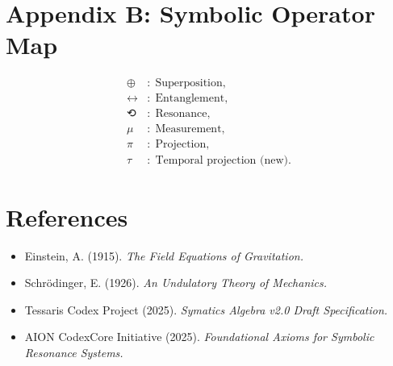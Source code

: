 \documentclass[12pt]{article}
\begin{document}
\section*{Appendix B: Symbolic Operator Map}
\begin{align*}
⊕ &:\; \text{Superposition}, \\
↔ &:\; \text{Entanglement}, \\
⟲ &:\; \text{Resonance}, \\
μ &:\; \text{Measurement}, \\
π &:\; \text{Projection}, \\
τ &:\; \text{Temporal projection (new)}.
\end{align*}

\section*{References}
\begin{itemize}
\item Einstein, A. (1915). \textit{The Field Equations of Gravitation.}
\item Schrödinger, E. (1926). \textit{An Undulatory Theory of Mechanics.}
\item Tessaris Codex Project (2025). \textit{Symatics Algebra v2.0 Draft Specification.}
\item AION CodexCore Initiative (2025). \textit{Foundational Axioms for Symbolic Resonance Systems.}
\end{itemize}
\end{document}

